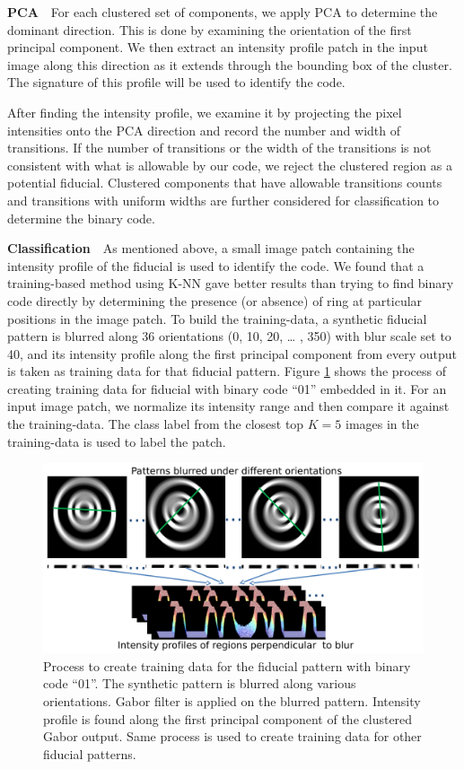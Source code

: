 \documentclass[runningheads]{llncs}
\begin{document}
\noindent\textbf{PCA}~~For each clustered set of components, we apply
PCA to determine the dominant direction.  This is done by examining the
orientation of the first principal component.  We then extract an intensity
profile patch in the input image along this direction as it extends through the
bounding box of the cluster. The signature of this profile will be used to
identify the code.

After finding the intensity profile, we examine it by
projecting the pixel intensities onto the PCA direction and record the
number and width of transitions.  If the number of transitions or the
width of the transitions is not consistent with what is allowable by
our code, we reject the clustered region as a potential fiducial.
Clustered components that have allowable transitions counts and transitions with
uniform widths are further considered for classification to determine
the binary code.

\noindent\textbf{Classification}~~As mentioned above, a small image patch
containing the intensity profile of the fiducial is used to identify the code.   We found
that a training-based method using K-NN gave better results than trying to
find binary code directly by determining the presence (or absence) of ring
at particular positions in the image patch. To build the training-data, a
synthetic fiducial pattern is blurred along 36 orientations (0, 10, 20, \ldots
, 350) with blur scale set to 40, and its intensity profile along the first
principal component from every output is taken as training data for that
fiducial pattern. Figure \ref{fig:training_data} shows the process of creating
training data for fiducial with binary code ``01'' embedded in it.  For an
input image patch, we normalize its intensity range and then compare it against
the training-data. The class label from the closest top $K=5$ images in the
training-data is used to label the patch.

\begin{figure}[h!]
\centering
  \includegraphics[width=0.8\linewidth]{training_data.pdf}
  \caption{Process to create training data for the fiducial pattern with binary
  code ``01''. The synthetic pattern is blurred along various orientations. Gabor
  filter is applied on the blurred pattern. Intensity profile is found along the
  first principal component of the clustered Gabor output. Same process is used
  to create training data for other fiducial patterns.}
  \label{fig:training_data}
\end{figure}
\end{document}
